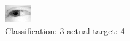 \begin{figure}[h!]
\begin{center}
\includegraphics[width=0.60\columnwidth]{figures/ID2476_class_3_target_4.png}
\end{center}
\caption{ Classification: 3 actual target: 4}
\label{fig:ID2476_class_3_target_4}
\end{figure}

